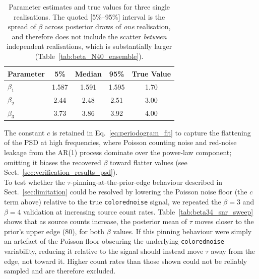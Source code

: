 \documentclass{aa}
\begin{document}
            \begin{table}[h]
                \caption{Parameter estimates and true values for three single realisations. The quoted [5\%--95\%] interval is the spread of $\beta$ across posterior draws of \emph{one} realisation, and therefore does not include the scatter \emph{between} independent realisations, which is substantially larger (Table~\ref{tab:beta_N40_ensemble}).}
                \centering
                \begin{tabular}{lcccc}
                \hline\hline
                Parameter & 5\% & Median & 95\% & True Value \\
                \hline
                $\beta_1$ & 1.587 & 1.591 & 1.595 & 1.70 \\
                $\beta_2$ & 2.44 & 2.48 & 2.51 & 3.00 \\
                $\beta_3$ & 3.73 & 3.86 & 3.92 & 4.00 \\
                \hline
                \end{tabular}
                \label{tab:appendix_params}
            \end{table}
The constant $c$ is retained in Eq.~\ref{eq:periodogram_fit} to capture the flattening of the PSD at high frequencies, where Poisson counting noise and red-noise leakage from the AR(1) process dominate over the power-law component; omitting it biases the recovered $\beta$ toward flatter values (see Sect.~\ref{sec:verification_results_psd}). \\
To test whether the $\tau$-pinning-at-the-prior-edge behaviour described in Sect.~\ref{sec:limitation} could be resolved by lowering the Poisson noise floor (the $c$ term above) relative to the true \texttt{colorednoise} signal, we repeated the $\beta = 3$ and $\beta = 4$ validation at increasing source count rates. Table~\ref{tab:beta34_snr_sweep} shows that as source counts increase, the posterior mean of $\tau$ moves closer to the prior's upper edge (80), for both $\beta$ values. If this pinning behaviour were simply an artefact of the Poisson floor obscuring the underlying \texttt{colorednoise} variability, reducing it relative to the signal should instead move $\tau$ away from the edge, not toward it. Higher count rates than those shown could not be reliably sampled and are therefore excluded.
\end{document}
